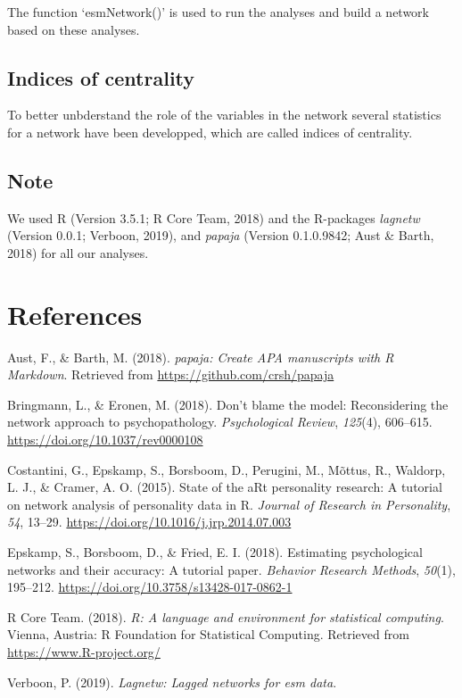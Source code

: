 \documentclass[man,floatsintext]{apa6}
\theoremstyle{definition}
\theoremstyle{definition}
\theoremstyle{definition}
\theoremstyle{remark}
\begin{document}
The function `esmNetwork()' is used to run the analyses and build a
network based on these analyses.

\subsection{Indices of centrality}\label{indices-of-centrality}

To better unbderstand the role of the variables in the network several
statistics for a network have been developped, which are called indices
of centrality.

\subsection{Note}\label{note}

We used R (Version 3.5.1; R Core Team, 2018) and the R-packages
\emph{lagnetw} (Version 0.0.1; Verboon, 2019), and \emph{papaja}
(Version 0.1.0.9842; Aust \& Barth, 2018) for all our analyses.

\newpage

\section{References}\label{references}

\begingroup
\setlength{\parindent}{-0.5in} \setlength{\leftskip}{0.5in}

\hypertarget{refs}{}
\hypertarget{ref-R-papaja}{}
Aust, F., \& Barth, M. (2018). \emph{papaja: Create APA manuscripts with
R Markdown}. Retrieved from \url{https://github.com/crsh/papaja}

\hypertarget{ref-Bringmann2018a}{}
Bringmann, L., \& Eronen, M. (2018). Don't blame the model:
Reconsidering the network approach to psychopathology.
\emph{Psychological Review}, \emph{125}(4), 606--615.
\url{https://doi.org/10.1037/rev0000108}

\hypertarget{ref-Costantini2015}{}
Costantini, G., Epskamp, S., Borsboom, D., Perugini, M., Mõttus, R.,
Waldorp, L. J., \& Cramer, A. O. (2015). State of the aRt personality
research: A tutorial on network analysis of personality data in R.
\emph{Journal of Research in Personality}, \emph{54}, 13--29.
\url{https://doi.org/10.1016/j.jrp.2014.07.003}

\hypertarget{ref-Epskamp2018}{}
Epskamp, S., Borsboom, D., \& Fried, E. I. (2018). Estimating
psychological networks and their accuracy: A tutorial paper.
\emph{Behavior Research Methods}, \emph{50}(1), 195--212.
\url{https://doi.org/10.3758/s13428-017-0862-1}

\hypertarget{ref-R-base}{}
R Core Team. (2018). \emph{R: A language and environment for statistical
computing}. Vienna, Austria: R Foundation for Statistical Computing.
Retrieved from \url{https://www.R-project.org/}

\hypertarget{ref-R-lagnetw}{}
Verboon, P. (2019). \emph{Lagnetw: Lagged networks for esm data}.

\endgroup
\end{document}
